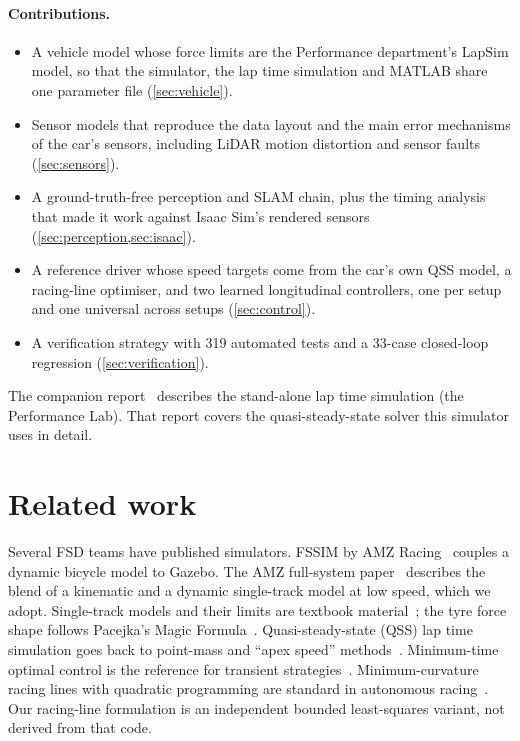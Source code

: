 \documentclass[11pt]{article}
\begin{document}
\paragraph{Contributions.}
\begin{itemize}
  \item A vehicle model whose force limits are the Performance department's LapSim model, so that the simulator,
        the lap time simulation and MATLAB share one parameter file (\cref{sec:vehicle}).
  \item Sensor models that reproduce the data layout and the main error mechanisms of the car's sensors, including
        LiDAR motion distortion and sensor faults (\cref{sec:sensors}).
  \item A ground-truth-free perception and SLAM chain, plus the timing analysis that made it work against Isaac
        Sim's rendered sensors (\cref{sec:perception,sec:isaac}).
  \item A reference driver whose speed targets come from the car's own QSS model, a racing-line optimiser, and two
        learned longitudinal controllers, one per setup and one universal across setups (\cref{sec:control}).
  \item A verification strategy with 319 automated tests and a 33-case closed-loop regression
        (\cref{sec:verification}).
\end{itemize}
The companion report~\cite{perflab} describes the stand-alone lap time simulation (the Performance Lab). That
report covers the quasi-steady-state solver this simulator uses in detail.

\section{Related work}\label{sec:related}
Several FSD teams have published simulators. FSSIM by AMZ Racing~\cite{fssim} couples a dynamic bicycle model to
Gazebo. The AMZ full-system paper~\cite{kabzan2020} describes the blend of a kinematic and a dynamic single-track
model at low speed, which we adopt. Single-track models and their limits are textbook material~\cite{rajamani2012};
the tyre force shape follows Pacejka's Magic Formula~\cite{pacejka2012}. Quasi-steady-state (QSS) lap time
simulation goes back to point-mass and ``apex speed'' methods~\cite{siegler2000,brayshaw2005}. Minimum-time optimal
control is the reference for transient strategies~\cite{casanova2000}. Minimum-curvature racing lines with
quadratic programming are standard in autonomous racing~\cite{heilmeier2020}. Our racing-line formulation is an
independent bounded least-squares variant, not derived from that code.
\end{document}

